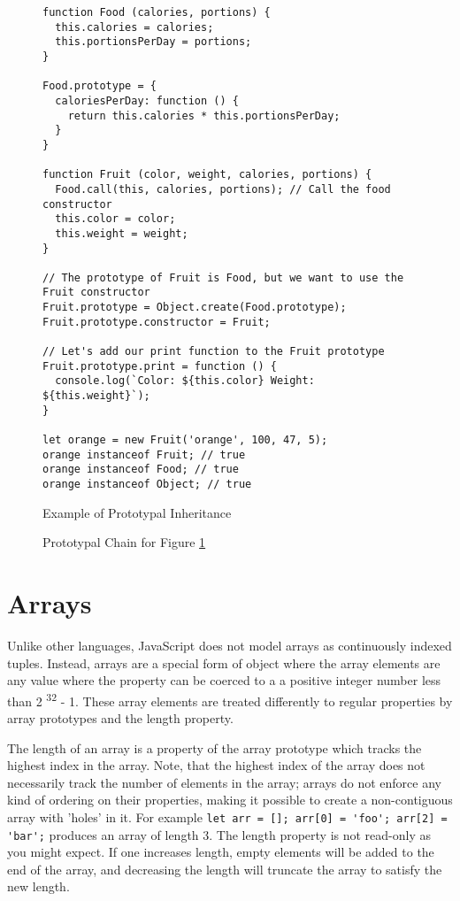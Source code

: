 \documentclass[]{final_report}
\begin{document}
\begin{figure}[h]
\begin{verbatim}
function Food (calories, portions) {
  this.calories = calories;
  this.portionsPerDay = portions;
}

Food.prototype = {
  caloriesPerDay: function () {
    return this.calories * this.portionsPerDay;
  }
}

function Fruit (color, weight, calories, portions) {
  Food.call(this, calories, portions); // Call the food constructor
  this.color = color;
  this.weight = weight;
}

// The prototype of Fruit is Food, but we want to use the Fruit constructor
Fruit.prototype = Object.create(Food.prototype);
Fruit.prototype.constructor = Fruit;

// Let's add our print function to the Fruit prototype
Fruit.prototype.print = function () {
  console.log(`Color: ${this.color} Weight: ${this.weight}`);
}

let orange = new Fruit('orange', 100, 47, 5);
orange instanceof Fruit; // true
orange instanceof Food; // true
orange instanceof Object; // true
\end{verbatim}
\caption{\label{fig:js-prototypal-inheritance} Example of Prototypal Inheritance}
\end{figure} 

\begin{figure}[h]
\centering
\fboxsep 2mm
\caption{\label{fig:js-prototypal-chain} Prototypal Chain for Figure \ref{fig:js-prototypal-inheritance}}
\end{figure} 

\section{Arrays}
Unlike other languages, JavaScript does not model arrays as continuously indexed tuples. Instead, arrays are a special form of object where the array elements are any value where the property can be coerced to a a positive integer number less than 2 \textsuperscript{32} - 1. These array elements are treated differently to regular properties by array prototypes and the length property. 

The length of an array is a property of the array prototype which tracks the highest index in the array. Note, that the highest index of the array does not necessarily track the number of elements in the array; arrays do not enforce any kind of ordering on their properties, making it possible to create a non-contiguous array with 'holes' in it. For example \lstinline{let arr = []; arr[0] = 'foo'; arr[2] = 'bar';} produces an array of length 3. The length property is not read-only as you might expect. If one increases length, empty elements will be added to the end of the array, and decreasing the length will truncate the array to satisfy the new length.
\end{document}
